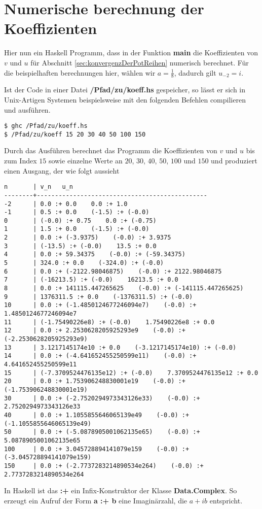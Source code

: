 \chapter{Numerische berechnung der Koeffizienten} \label{anh:Programm}
Hier nun ein Haskell Programm, dass in der Funktion \textbf{main} die
Koeffizienten von $v$ und $u$ für Abschnitt \ref{sec:konvergenzDerPotReihen} 
numerisch berechnet. Für die beispielhaften berechnungen hier, wählen wir
$a=\frac{1}{8}$, dadurch gilt $u_{-2}=i$.


Ist der Code in einer Datei \textbf{/Pfad/zu/koeff.hs} gespeicher, so lässt er
sich in Unix-Artigen Systemen beispielsweise mit den folgenden Befehlen
compilieren und ausführen.
\begin{lstlisting}[style=Bash]
$ ghc /Pfad/zu/koeff.hs
$ /Pfad/zu/koeff 15 20 30 40 50 100 150
\end{lstlisting}
Durch das Ausführen berechnet das Programm die Koeffizienten von $v$ und $u$
bis zum Index $15$ sowie einzelne Werte an $20$, $30$, $40$, $50$, $100$ und
$150$ und produziert einen Ausgang, der wie folgt aussieht
\begin{lstlisting}[style=Bash]
n       | v_n   u_n
--------+-----------------------------------------------
-2      | 0.0 :+ 0.0    0.0 :+ 1.0
-1      | 0.5 :+ 0.0    (-1.5) :+ (-0.0)
0       | (-0.0) :+ 0.75    0.0 :+ (-0.75)
1       | 1.5 :+ 0.0    (-1.5) :+ (-0.0)
2       | 0.0 :+ (-3.9375)    (-0.0) :+ 3.9375
3       | (-13.5) :+ (-0.0)    13.5 :+ 0.0
4       | 0.0 :+ 59.34375    (-0.0) :+ (-59.34375)
5       | 324.0 :+ 0.0    (-324.0) :+ (-0.0)
6       | 0.0 :+ (-2122.98046875)    (-0.0) :+ 2122.98046875
7       | (-16213.5) :+ (-0.0)    16213.5 :+ 0.0
8       | 0.0 :+ 141115.447265625    (-0.0) :+ (-141115.447265625)
9       | 1376311.5 :+ 0.0    (-1376311.5) :+ (-0.0)
10      | 0.0 :+ (-1.4850124677246094e7)    (-0.0) :+ 1.4850124677246094e7
11      | (-1.75490226e8) :+ (-0.0)    1.75490226e8 :+ 0.0
12      | 0.0 :+ 2.2530628205925293e9    (-0.0) :+ (-2.2530628205925293e9)
13      | 3.1217145174e10 :+ 0.0    (-3.1217145174e10) :+ (-0.0)
14      | 0.0 :+ (-4.641652455250599e11)    (-0.0) :+ 4.641652455250599e11
15      | (-7.3709524476135e12) :+ (-0.0)    7.3709524476135e12 :+ 0.0
20      | 0.0 :+ 1.753906248830001e19    (-0.0) :+ (-1.753906248830001e19)
30      | 0.0 :+ (-2.7520294973343126e33)    (-0.0) :+ 2.7520294973343126e33
40      | 0.0 :+ 1.1055855646065139e49    (-0.0) :+ (-1.1055855646065139e49)
50      | 0.0 :+ (-5.0878905001062135e65)    (-0.0) :+ 5.0878905001062135e65
100     | 0.0 :+ 3.045728894141079e159    (-0.0) :+ (-3.045728894141079e159)
150     | 0.0 :+ (-2.7737283214890534e264)    (-0.0) :+ 2.7737283214890534e264

\end{lstlisting}
In Haskell ist das \textbf{:+} ein Infix-Konstruktor der Klasse
\textbf{Data.Complex}. So erzeugt ein Aufruf der Form \textbf{a :+ b} eine
Imaginärzahl, die $a+ib$ entspricht.

